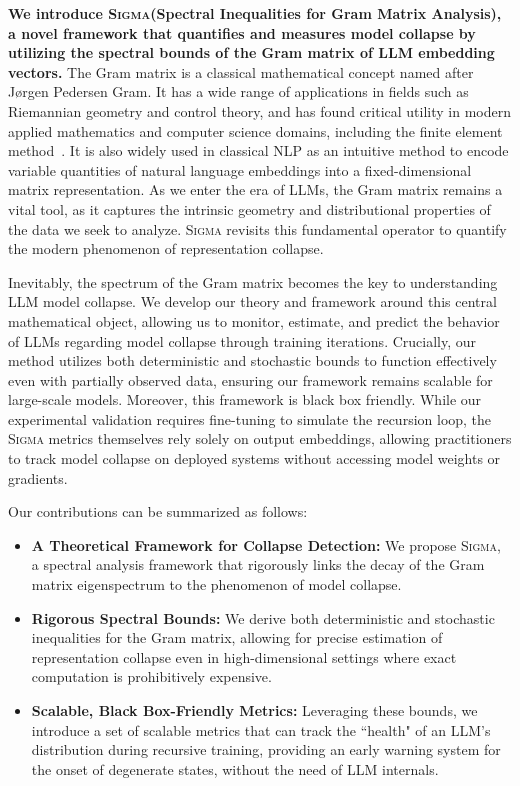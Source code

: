 \documentclass{article}
\theoremstyle{plain}
\theoremstyle{definition}
\theoremstyle{remark}
\newcommand{\sgma}{\textsc{Sigma}\xspace}
\begin{document}
\textbf{We introduce \sgma (\textbf{S}pectral \textbf{I}nequalities for \textbf{G}ram \textbf{M}atrix \textbf{A}nalysis), a novel framework that quantifies and measures model collapse by utilizing the spectral bounds of the Gram matrix of LLM embedding vectors.} The Gram matrix is a classical mathematical concept named after Jørgen Pedersen Gram. It has a wide range of applications in fields such as Riemannian geometry and control theory, and has found critical utility in modern applied mathematics and computer science domains, including the finite element method~\cite{10.5555/894170}. It is also widely used in classical NLP as an intuitive method to encode variable quantities of natural language embeddings into a fixed-dimensional matrix representation\cite{10.1162/153244302760200687,NIPS2014_b7866697}. As we enter the era of LLMs, the Gram matrix remains a vital tool, as it captures the intrinsic geometry and distributional properties of the data we seek to analyze. \sgma revisits this fundamental operator to quantify the modern phenomenon of representation collapse.

Inevitably, the spectrum of the Gram matrix becomes the key to understanding LLM model collapse. We develop our theory and framework around this central mathematical object, allowing us to monitor, estimate, and predict the behavior of LLMs regarding model collapse through training iterations. Crucially, our method utilizes both deterministic and stochastic bounds to function effectively even with partially observed data, ensuring our framework remains scalable for large-scale models. Moreover, this framework is black box friendly. While our experimental validation requires fine-tuning to simulate the recursion loop, the \sgma metrics themselves rely solely on output embeddings, allowing practitioners to track model collapse on deployed systems without accessing model weights or gradients.

Our contributions can be summarized as follows:
\begin{itemize}[leftmargin=*]
    \item \textbf{A Theoretical Framework for Collapse Detection:} We propose \sgma, a spectral analysis framework that rigorously links the decay of the Gram matrix eigenspectrum to the phenomenon of model collapse.
    \item \textbf{Rigorous Spectral Bounds:} We derive both deterministic and stochastic inequalities for the Gram matrix, allowing for precise estimation of representation collapse even in high-dimensional settings where exact computation is prohibitively expensive.
    \item \textbf{Scalable, Black Box-Friendly Metrics:} Leveraging these bounds, we introduce a set of scalable metrics that can track the ``health" of an LLM's distribution during recursive training, providing an early warning system for the onset of degenerate states, without the need of LLM internals.
\end{itemize}
\end{document}

